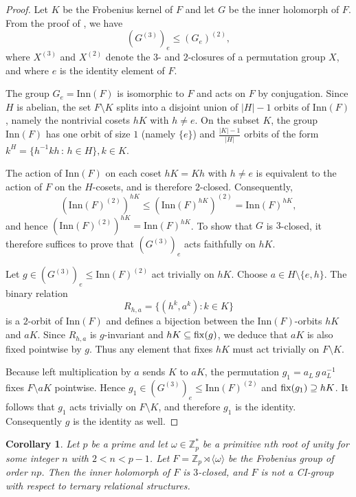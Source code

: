\documentclass[11pt]{amsart}
\numberwithin{equation}{section}
\newtheorem{cor}[thrm]{Corollary}
\theoremstyle{definition}
\def\fix{{\rm fix}}
\def\Z{{\mathbb Z}}
\newcommand{\inn}{\mathrm{Inn}}
\begin{document}
	\begin{proof}
		Let $K$ be the Frobenius kernel of $F$ and let $G$ be the inner holomorph of $F$.  
		From the proof of \cite[Theorem 2.4]{OBrienPVV2022}, we have
		\[
		(G^{(3)})_e \leq (G_e)^{(2)},
		\]
		where $X^{(3)}$ and $X^{(2)}$ denote the $3$- and $2$-closures of a permutation group $X$, and where $e$ is the identity element of $F$.
		
		The group $G_e = \inn(F)$ is isomorphic to $F$ and acts on $F$ by conjugation.  
		Since $H$ is abelian, the set $F\setminus K$ splits into a disjoint union of $|H|-1$ orbits of $\inn(F)$, namely the nontrivial cosets $hK$ with $h\neq e$.  
		On the subset $K$, the group $\inn(F)$ has one orbit of size $1$ (namely $\{e\}$) and $\frac{|K|-1}{|H|}$ orbits of the form
		$k^H=\{h^{-1}kh\,:\, h\in H\},  k\in K$.
		
		The action of $\inn(F)$ on each coset $hK=Kh$ with $h\neq e$ is equivalent to the action of $F$ on the $H$-cosets, and is therefore $2$-closed.  
		Consequently,
		\[
		(\inn(F)^{(2)})^{hK} \leq (\inn(F)^{hK})^{(2)} = \inn(F)^{hK},
		\]
		and hence $(\inn(F)^{(2)})^{hK} = \inn(F)^{hK}$.  
		To show that $G$ is $3$-closed, it therefore suffices to prove that $(G^{(3)})_e$ acts faithfully on $hK$.
		
		Let $g \in (G^{(3)})_e \leq \inn(F)^{(2)}$ act trivially on $hK$.  
		Choose $a \in H\setminus\{e,h\}$.  
		The binary relation
		\[
		R_{h,a} = \{(h^k,a^k) : k \in K\}
		\]
		is a $2$-orbit of $\inn(F)$ and defines a bijection between the $\inn(F)$-orbits $hK$ and $aK$.  
		Since $R_{h,a}$ is $g$-invariant and $hK \subseteq \fix(g)$, we deduce that $aK$ is also fixed pointwise by $g$.  
		Thus any element that fixes $hK$ must act trivially on $F\setminus K$.
		
		Because left multiplication by $a$ sends $K$ to $aK$, the permutation
		$g_1 = a_L \, g \, a_L^{-1}$
		fixes $F\setminus aK$ pointwise.  
		Hence $g_1 \in (G^{(3)})_e \leq \inn(F)^{(2)}$ and $\fix(g_1) \supseteq hK$.  
		It follows that $g_1$ acts trivially on $F\setminus K$, and therefore $g_1$ is the identity.  
		Consequently $g$ is the identity as well.
	\end{proof}
	
	\begin{cor}\label{cor1} Let $p$ be a prime and let $\omega \in \Z_p^*$ be a primitive $n$th root of unity for some integer $n$ with $2 < n < p-1$. 
		Let $F = \Z_p \rtimes \langle \omega \rangle$ be the Frobenius group of order $np$. 
		Then the inner holomorph of $F$ is $3$-closed, and $F$ is not a CI-group with respect to ternary relational structures.
	\end{cor}
	
\end{document}
